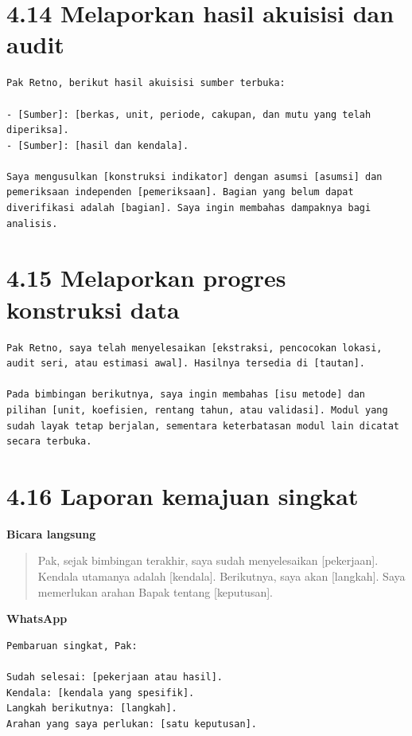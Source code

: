 \documentclass[
  indonesian,
]{article}
\renewcommand{\subsection}{\section}
\begin{document}
\subsection{4.14 Melaporkan hasil akuisisi dan
audit}\label{melaporkan-hasil-akuisisi-dan-audit}

\begin{verbatim}
Pak Retno, berikut hasil akuisisi sumber terbuka:

- [Sumber]: [berkas, unit, periode, cakupan, dan mutu yang telah diperiksa].
- [Sumber]: [hasil dan kendala].

Saya mengusulkan [konstruksi indikator] dengan asumsi [asumsi] dan pemeriksaan independen [pemeriksaan]. Bagian yang belum dapat diverifikasi adalah [bagian]. Saya ingin membahas dampaknya bagi analisis.
\end{verbatim}

\subsection{4.15 Melaporkan progres konstruksi
data}\label{melaporkan-progres-konstruksi-data}

\begin{verbatim}
Pak Retno, saya telah menyelesaikan [ekstraksi, pencocokan lokasi, audit seri, atau estimasi awal]. Hasilnya tersedia di [tautan].

Pada bimbingan berikutnya, saya ingin membahas [isu metode] dan pilihan [unit, koefisien, rentang tahun, atau validasi]. Modul yang sudah layak tetap berjalan, sementara keterbatasan modul lain dicatat secara terbuka.
\end{verbatim}

\subsection{4.16 Laporan kemajuan
singkat}\label{laporan-kemajuan-singkat}

\textbf{Bicara langsung}

\begin{quote}
Pak, sejak bimbingan terakhir, saya sudah menyelesaikan {[}pekerjaan{]}.
Kendala utamanya adalah {[}kendala{]}. Berikutnya, saya akan
{[}langkah{]}. Saya memerlukan arahan Bapak tentang {[}keputusan{]}.
\end{quote}

\textbf{WhatsApp}

\begin{verbatim}
Pembaruan singkat, Pak:

Sudah selesai: [pekerjaan atau hasil].
Kendala: [kendala yang spesifik].
Langkah berikutnya: [langkah].
Arahan yang saya perlukan: [satu keputusan].
\end{verbatim}
\end{document}
